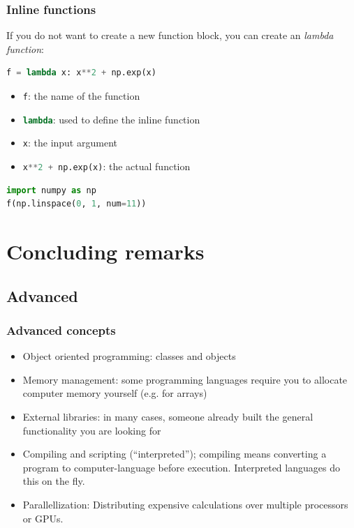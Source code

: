 \begin{frame}[fragile]
  \frametitle{Inline functions}
  If you do not want to create a new function block, you can create an \emph{lambda function}:
  \begin{lstlisting}[language=Python]
f = lambda x: x**2 + np.exp(x)
  \end{lstlisting}
  \pause
  \begin{itemize}
    \item \lstinline[language=Python]|f|: the name of the function
    \item \lstinline[language=Python]|lambda|: used to define the inline function
    \item \lstinline[language=Python]|x|: the input argument
    \item \lstinline[language=Python]|x**2 + np.exp(x)|: the actual function
  \end{itemize}\pause
  \begin{lstlisting}[language=Python]
import numpy as np
f(np.linspace(0, 1, num=11))
  \end{lstlisting}
\end{frame}


\section{Concluding remarks}
\subsection*{Advanced}
\begin{frame}
  \frametitle{Advanced concepts}
  \begin{itemize}
    \item Object oriented programming: classes and objects
    \item Memory management: some programming languages require you to allocate computer memory yourself (e.g. for arrays)
    \item External libraries: in many cases, someone already built the general functionality you are looking for
    \item Compiling and scripting (``interpreted''); compiling means converting a program to computer-language before execution. Interpreted languages do this on the fly.
    \item Parallellization: Distributing expensive calculations over multiple processors or GPUs.
  \end{itemize}\pause
 \end{frame}

